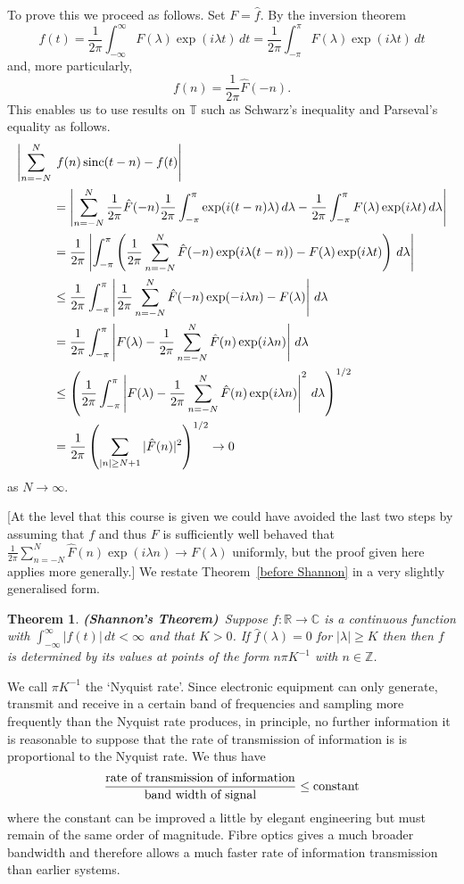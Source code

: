 \documentclass[12pt]{article}
\newtheorem{theorem}{Theorem}[section]
\theoremstyle{definition}
\newcommand{\sinc}{\operatorname{sinc}}
\begin{document}
To prove this we proceed as follows. Set $F=\hat{f}$.
By the inversion theorem 
\[f(t)=\frac{1}{2\pi}\int_{-\infty}^{\infty}F(\lambda)\exp(i\lambda t)\,dt
=\frac{1}{2\pi}\int_{-\pi}^{\pi}F(\lambda)\exp(i\lambda t)\,dt\]
and, more particularly,
\[f(n)=\frac{1}{2\pi}\hat{F}(-n).\]
This enables us to use results on ${\mathbb T}$ such as 
Schwarz's inequality and Parseval's equality as follows.
\begin{align*}
\left|\sum_{n=-N}^{N}\right.&\left.\vphantom{\sum_{n=-N}^{N}}
f(n)\sinc(t-n)-f(t)\right|\\
&=\left|\sum_{n=-N}^{N}\frac{1}{2\pi}\hat{F}(-n)
\frac{1}{2\pi}\int_{-\pi}^{\pi}\exp(i(t-n)\lambda)\,d\lambda
-\frac{1}{2\pi}\int_{-\pi}^{\pi}F(\lambda)\exp(i\lambda t)\,d\lambda\right|\\
&=\frac{1}{2\pi}\left|\int_{-\pi}^{\pi}
\left(\frac{1}{2\pi}\sum_{n=-N}^{N}\hat{F}(-n)\exp(i\lambda(t-n))
-F(\lambda)\exp(i\lambda t)\right)\,d\lambda\right|\\
&\leq \frac{1}{2\pi}\int_{-\pi}^{\pi}
\left|\frac{1}{2\pi}\sum_{n=-N}^{N}\hat{F}(-n)\exp(-i\lambda n)-F(\lambda)
\right|\,d\lambda\\
&=\frac{1}{2\pi}\int_{-\pi}^{\pi}
\left|F(\lambda)-\frac{1}{2\pi}\sum_{n=-N}^{N}\hat{F}(n)\exp(i\lambda n)
\right|\,d\lambda\\
&\leq\left(
\frac{1}{2\pi}\int_{-\pi}^{\pi}
\left|F(\lambda)-\frac{1}{2\pi}\sum_{n=-N}^{N}\hat{F}(n)\exp(i\lambda n)
\right|^{2}\,d\lambda\right)^{1/2}\\
&=\frac{1}{2\pi}\left(\sum_{|n|\geq N+1}|\hat{F}(n)|^{2}\right)^{1/2}
\rightarrow 0
\end{align*}
as $N\rightarrow\infty$.

[At the level that this course is given we could have avoided
the last two steps by assuming that $f$ and thus $F$ is 
sufficiently well behaved that
$\frac{1}{2\pi}\sum_{n=-N}^{N}\hat{F}(n)\exp(i\lambda n)
\rightarrow F(\lambda)$ uniformly, but the proof given here
applies more generally.]
We restate Theorem~\ref{before Shannon} in a very slightly
generalised form.
\begin{theorem}{\bf (Shannon's Theorem)}~\label{Shannon}
Suppose $f:{\mathbb R}\rightarrow{\mathbb C}$
is a continuous function with
$\int_{-\infty}^{\infty}|f(t)|\,dt<\infty$
and that $K>0$.
If $\hat{f}(\lambda)=0$
for $|\lambda|\geq K$
then then $f$ is determined by its values at points of the form
$n\pi K^{-1}$ with $n\in{\mathbb Z}$.
\end{theorem}
We call $\pi K^{-1}$ the `Nyquist rate'. Since
electronic equipment can only generate, transmit
and receive in a certain band of frequencies
and sampling more frequently than the Nyquist
rate produces, in principle, no further information
it is reasonable to suppose that the rate of transmission
of information is is proportional to the Nyquist
rate. We thus have
\[\frac{\text{\rm rate of transmission of information}}
{\text{\rm band width of signal}}\leq\text{\rm constant}\]
where the constant can be improved a little by elegant
engineering but must remain of the same order of magnitude.
Fibre optics gives a much broader bandwidth and therefore
allows a much faster rate of information transmission than earlier
systems.
\end{document}
